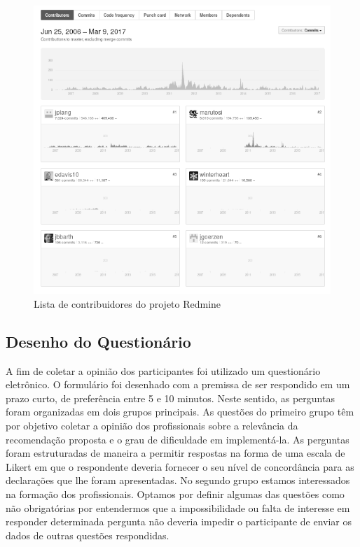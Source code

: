 \begin{figure}[htpb]
	\centering
	\includegraphics[width=0.8\linewidth]{./chapter-sugestoes-melhorias-fgrm/img/redmine_contribuidores.png}
	\caption{Lista de contribuidores do projeto Redmine}
\label{fig:redmine_contribuidores}
\end{figure}

\subsection{Desenho do Questionário}
\label{ssub:sug_melhoria_desenho_questionario}

A fim de coletar a opinião dos participantes foi utilizado um questionário
eletrônico. O formulário foi desenhado com a premissa de ser respondido em um
prazo curto, de preferência entre 5 e 10 minutos. Neste sentido, as perguntas
foram organizadas em dois grupos principais. As questões do primeiro grupo têm
por objetivo coletar a opinião dos profissionais sobre a relevância da
recomendação proposta e o grau de dificuldade em implementá-la. As perguntas
foram estruturadas de maneira a permitir respostas na forma de uma escala de
Likert em que o respondente deveria fornecer o seu nível de concordância para as
declarações que lhe foram apresentadas. No segundo grupo estamos interessados na
formação dos profissionais. Optamos por definir algumas das questões como não
obrigatórias por entendermos que a impossibilidade ou falta de interesse em
responder determinada pergunta não deveria impedir o participante de enviar os
dados de outras questões respondidas.

